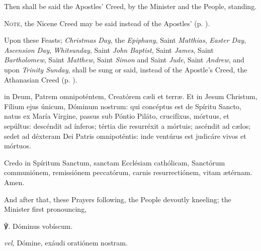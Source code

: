 \vspace{-2ex}
\begin{rubric}
    Then shall be said the Apostles' Creed, by the Minister and the People, standing.\par%
    \textsc{Note,} the Nicene Creed may be said instead of the Apostles' (p. \pageref{NiceneCreed}).
\end{rubric}
\begin{rubric}
    Upon these Feasts; \emph{Christmas Day}, the \emph{Epiphany}, Saint \emph{Matthias}, \emph{Easter Day}, \emph{Ascension Day}, \emph{Whitsunday}, Saint \emph{John Baptist}, Saint \emph{James}, Saint \emph{Bartholomew}, Saint \emph{Matthew}, Saint \emph{Simon} and Saint \emph{Jude}, Saint \emph{Andrew}, and upon \emph{Trinity Sunday}, shall be sung or said, instead of the Apostle's Creed, the Athanasian Creed (p. \pageref{Ath}).
\end{rubric}
 in Deum, Patrem omnipoténtem, Creatórem c{\ae}li et terr{\ae}. Et in Jesum Christum, Fílium ejus únicum, Dóminum nostrum: qui concéptus est de Spíritu Sancto, natus ex María Vírgine, passus sub Póntio Piláto, crucifíxus, mórtuus, et sepúltus: descéndit ad ínferos; tértia die resurréxit a mórtuis; ascéndit ad c{\ae}los; sedet ad déxteram Dei Patris omnipoténtis: inde ventúrus est judicáre vivos et mórtuos.\par
     Credo in Spíritum Sanctum, sanctam Ecclésiam cathólicam, Sanctórum communiónem, remissiónem peccatórum, carnis {} resurrectiónem, vitam {\ae}térnam. Amen.

\begin{rubric}
    And after that, these Prayers following, the People devoutly kneeling; the Minister first pronouncing,
\end{rubric}
℣. Dóminus vobíscum.\par
\textit{vel,} Dómine, exáudi oratiónem nostram.

